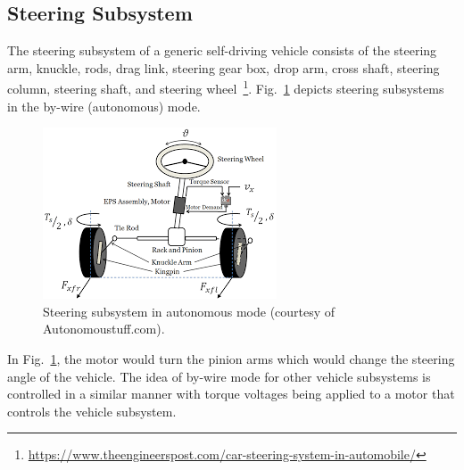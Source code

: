 \documentclass[conference]{IEEEtran}
\begin{document}
\subsection{Steering Subsystem}
\label{sec:steeringSubsystem}

The steering subsystem of a generic self-driving vehicle consists of the steering arm, knuckle, rods, drag link, steering gear box, drop arm, cross shaft, steering column, steering shaft, and steering wheel~\footnote{\url{https://www.theengineerspost.com/car-steering-system-in-automobile/}}. Fig.~\ref{fig:steerOverview} depicts steering subsystems in the by-wire (autonomous) mode.  %
%
\begin{figure}[htbp]
  \centering
  \includegraphics[scale=0.8]{figs/img/autonomousVehiclesSteering}
  \caption{Steering subsystem in autonomous mode (courtesy of Autonomoustuff.com).}
  \label{fig:steerOverview}
\end{figure}
%
In Fig.~\ref{fig:steerOverview}, the motor would
turn the pinion arms which would change the steering angle of the vehicle. The idea of by-wire mode for other vehicle subsystems is controlled in a similar manner with torque voltages being applied to a motor that controls the vehicle subsystem.
\end{document}
